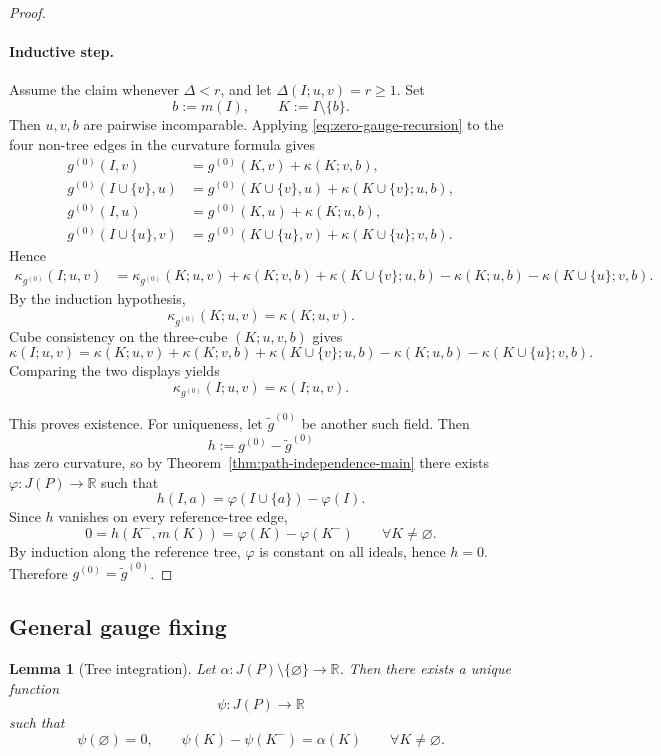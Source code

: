 \documentclass{article}
\newtheorem{lemma}[theorem]{Lemma}
\theoremstyle{definition}
\newcommand{\RR}{\mathbb R}
\begin{document}
\begin{proof}
\paragraph{Inductive step.}
Assume the claim whenever \(\Delta<r\), and let \(\Delta(I;u,v)=r\ge 1\). Set
\[
b:=m(I),\qquad K:=I\setminus\{b\}.
\]
Then \(u,v,b\) are pairwise incomparable. Applying \eqref{eq:zero-gauge-recursion} to the four non-tree edges in the curvature formula gives
\begin{align*}
g^{(0)}(I,v)&=g^{(0)}(K,v)+\kappa(K;v,b),\\
g^{(0)}(I\cup\{v\},u)&=g^{(0)}(K\cup\{v\},u)+\kappa(K\cup\{v\};u,b),\\
g^{(0)}(I,u)&=g^{(0)}(K,u)+\kappa(K;u,b),\\
g^{(0)}(I\cup\{u\},v)&=g^{(0)}(K\cup\{u\},v)+\kappa(K\cup\{u\};v,b).
\end{align*}
Hence
\begin{align*}
\kappa_{g^{(0)}}(I;u,v)
&=
\kappa_{g^{(0)}}(K;u,v)
+\kappa(K;v,b)+\kappa(K\cup\{v\};u,b)-\kappa(K;u,b)-\kappa(K\cup\{u\};v,b).
\end{align*}
By the induction hypothesis,
\[
\kappa_{g^{(0)}}(K;u,v)=\kappa(K;u,v).
\]
Cube consistency on the three-cube \((K;u,v,b)\) gives
\[
\kappa(I;u,v)
=
\kappa(K;u,v)
+\kappa(K;v,b)+\kappa(K\cup\{v\};u,b)-\kappa(K;u,b)-\kappa(K\cup\{u\};v,b).
\]
Comparing the two displays yields
\[
\kappa_{g^{(0)}}(I;u,v)=\kappa(I;u,v).
\]

This proves existence. For uniqueness, let \(\tilde g^{(0)}\) be another such field. Then
\[
h:=g^{(0)}-\tilde g^{(0)}
\]
has zero curvature, so by Theorem~\ref{thm:path-independence-main} there exists \(\varphi:J(P)\to\RR\) such that
\[
h(I,a)=\varphi(I\cup\{a\})-\varphi(I).
\]
Since \(h\) vanishes on every reference-tree edge,
\[
0=h(K^-,m(K))=\varphi(K)-\varphi(K^-)
\qquad \forall K\neq \varnothing.
\]
By induction along the reference tree, \(\varphi\) is constant on all ideals, hence \(h=0\). Therefore \(g^{(0)}=\tilde g^{(0)}\).
\end{proof}

\subsection{General gauge fixing}

\begin{lemma}[Tree integration]
\label{lem:tree-potential-app}
Let \(\alpha:J(P)\setminus\{\varnothing\}\to\RR\). Then there exists a unique function
\[
\psi:J(P)\to\RR
\]
such that
\begin{equation}
\psi(\varnothing)=0,
\qquad
\psi(K)-\psi(K^-)=\alpha(K)
\qquad
\forall K\neq \varnothing.
\label{eq:tree-integration}
\end{equation}
\end{lemma}
\end{document}
